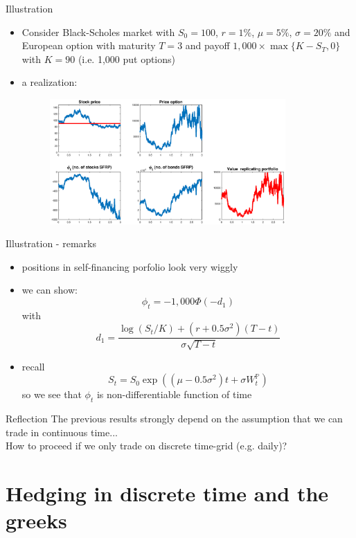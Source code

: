 \documentclass[pdf, handout]{beamer}
\begin{document}
\begin{frame}{Illustration}
\begin{itemize}
\item Consider Black-Scholes market with $S_0=100$, $r=1\%$, $\mu=5\%$, $\sigma=20\%$ and European option with maturity $T=3$
and payoff $1,000\times \max\{K-S_T,0\}$ with $K=90$ (i.e. 1,000 put options)
\item a realization:
\begin{figure}
\includegraphics[width=0.85\textwidth]{illu_put.eps}
\end{figure}
\end{itemize}
\end{frame}

\begin{frame}{Illustration - remarks}
\begin{itemize}
\item positions in self-financing porfolio look very wiggly
\item we can show:
\[
\phi_t = - 1,000 \Phi(-d_1)  
\]
with
\[
d_1 =
\frac{
\log(S_t/K)+(r +0.5 \sigma^2)(T-t)}{\sigma\sqrt{T-t}}
\]
\item recall
\[
S_t = S_0 \exp( (\mu-0.5\sigma^2) t + \sigma W_t^{\mathbb{P}})
\]
so we see that $\phi_t$ is non-differentiable function of time
\end{itemize}
\end{frame}

\begin{frame}{Reflection}
The previous results strongly depend on the assumption that we can trade in continuous time...
\\ \vspace{.5cm}
How to proceed if we only trade
on discrete time-grid (e.g. daily)?
\end{frame}

\section{Hedging in discrete time and the greeks}
\end{document}
